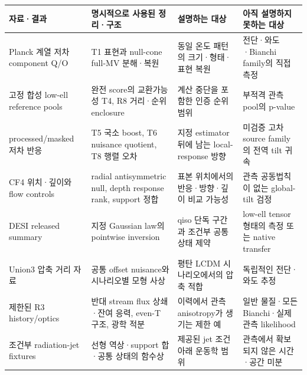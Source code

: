 \documentclass[11pt,a4paper]{article}
\begin{document}
{\small\setlength{\tabcolsep}{4pt}\renewcommand{\arraystretch}{1.3}

\begin{longtable}{>{\raggedright\arraybackslash}p{0.2000\dimexpr\linewidth-32pt\relax}>{\raggedright\arraybackslash}p{0.2700\dimexpr\linewidth-32pt\relax}>{\raggedright\arraybackslash}p{0.2700\dimexpr\linewidth-32pt\relax}>{\raggedright\arraybackslash}p{0.2600\dimexpr\linewidth-32pt\relax}}\toprule

자료·결과 & 명시적으로 사용된 정리·구조 & 설명하는 대상 & 아직 설명하지 못하는 대상 \\

\midrule\endhead

[실행] Planck 계열 저차 component Q/O & T1 표현과 null-cone full-MV 분해·복원 & 동일 온도 패턴의 크기·형태·표현 복원 & 전단·와도·Bianchi family의 직접 측정 \\

[실행/조건부] 고정 합성 low-ell reference pools & 완전 score의 교환가능성 T4, R8 거리·순위 enclosure & 계산 중단을 포함한 인증 순위 범위 & 부적격 관측 pool의 p-value \\

[조건부] processed/masked 저차 반응 & T5 국소 boost, T6 nuisance quotient, T8 행렬 오차 & 지정 estimator 뒤에 남는 local-response 방향 & 미검증 고차 source family의 전역 tilt 귀속 \\

[해석] CF4 위치·깊이와 flow controls & radial antisymmetric null, depth response rank, support 정합 & 표본 위치에서의 반응·방향·깊이 비교 가능성 & 관측 공동법칙이 없는 global-tilt 검정 \\

[실행] DESI released summary & 지정 Gaussian law의 pointwise inversion & qiso 단독 구간과 조건부 공통 상태 제약 & low-ell tensor 형태의 측정 또는 native transfer \\

[실행] Union3 압축 거리 자료 & 공통 offset nuisance와 시나리오별 모형 사상 & 평탄 LCDM 시나리오에서의 압축 적합 & 독립적인 전단·와도 추정 \\

[실행] 제한된 R3 history/optics & 반대 stream flux 상쇄·잔여 응력, even-T 구조, 광학 적분 & 이력에서 관측 anisotropy가 생기는 제한 예 & 일반 물질·모든 Bianchi·실제 관측 likelihood \\

[실행: fixture] 조건부 radiation-jet fixtures & 선형 역상·support 합·공통 상태의 함수상 & 제공된 jet 조건 아래 운동학 범위 & 관측에서 확보되지 않은 시간·공간 미분 \\

\bottomrule\end{longtable}}
\end{document}
